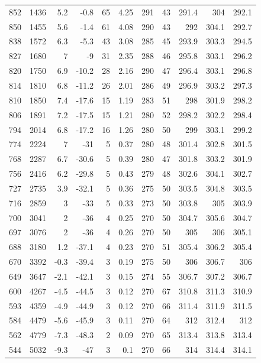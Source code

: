 \documentclass{article}
\begin{document}
\begin{longtable}{|r|r|r|r|r|r|r|r|r|r|r}
852 & 1436 & 5.2 & -0.8 & 65 & 4.25 & 291 & 43 & 291.4 & 304 & 292.1 \\
850 & 1455 & 5.6 & -1.4 & 61 & 4.08 & 290 & 43 & 292 & 304.1 & 292.7 \\
838 & 1572 & 6.3 & -5.3 & 43 & 3.08 & 285 & 45 & 293.9 & 303.3 & 294.5 \\
827 & 1680 & 7 & -9 & 31 & 2.35 & 288 & 46 & 295.8 & 303.1 & 296.2 \\
820 & 1750 & 6.9 & -10.2 & 28 & 2.16 & 290 & 47 & 296.4 & 303.1 & 296.8 \\
814 & 1810 & 6.8 & -11.2 & 26 & 2.01 & 286 & 49 & 296.9 & 303.2 & 297.3 \\
810 & 1850 & 7.4 & -17.6 & 15 & 1.19 & 283 & 51 & 298 & 301.9 & 298.2 \\
806 & 1891 & 7.2 & -17.5 & 15 & 1.21 & 280 & 52 & 298.2 & 302.2 & 298.4 \\
794 & 2014 & 6.8 & -17.2 & 16 & 1.26 & 280 & 50 & 299 & 303.1 & 299.2 \\
774 & 2224 & 7 & -31 & 5 & 0.37 & 280 & 48 & 301.4 & 302.8 & 301.5 \\
768 & 2287 & 6.7 & -30.6 & 5 & 0.39 & 280 & 47 & 301.8 & 303.2 & 301.9 \\
756 & 2416 & 6.2 & -29.8 & 5 & 0.43 & 279 & 48 & 302.6 & 304.1 & 302.7 \\
727 & 2735 & 3.9 & -32.1 & 5 & 0.36 & 275 & 50 & 303.5 & 304.8 & 303.5 \\
716 & 2859 & 3 & -33 & 5 & 0.33 & 273 & 50 & 303.8 & 305 & 303.9 \\
700 & 3041 & 2 & -36 & 4 & 0.25 & 270 & 50 & 304.7 & 305.6 & 304.7 \\
697 & 3076 & 2 & -36 & 4 & 0.26 & 270 & 50 & 305 & 306 & 305.1 \\
688 & 3180 & 1.2 & -37.1 & 4 & 0.23 & 270 & 51 & 305.4 & 306.2 & 305.4 \\
670 & 3392 & -0.3 & -39.4 & 3 & 0.19 & 275 & 50 & 306 & 306.7 & 306 \\
649 & 3647 & -2.1 & -42.1 & 3 & 0.15 & 274 & 55 & 306.7 & 307.2 & 306.7 \\
600 & 4267 & -4.5 & -44.5 & 3 & 0.12 & 270 & 67 & 310.8 & 311.3 & 310.9 \\
593 & 4359 & -4.9 & -44.9 & 3 & 0.12 & 270 & 66 & 311.4 & 311.9 & 311.5 \\
584 & 4479 & -5.6 & -45.9 & 3 & 0.11 & 270 & 64 & 312 & 312.4 & 312 \\
562 & 4779 & -7.3 & -48.3 & 2 & 0.09 & 270 & 65 & 313.4 & 313.8 & 313.4 \\
544 & 5032 & -9.3 & -47 & 3 & 0.1 & 270 & 66 & 314 & 314.4 & 314.1 \\

\end{longtable}
\end{document}
